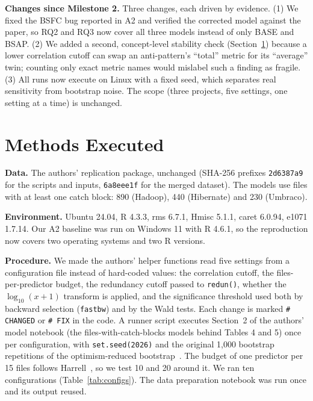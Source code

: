 \documentclass[conference]{IEEEtran}
\begin{document}
\textbf{Changes since Milestone 2.} Three changes, each driven by evidence. (1) We fixed the BSFC bug reported in A2 and verified the corrected model against the paper, so RQ2 and RQ3 now cover all three models instead of only BASE and BSAP. (2) We added a second, concept-level stability check (Section~\ref{sec:methods}) because a lower correlation cutoff can swap an anti-pattern's ``total'' metric for its ``average'' twin; counting only exact metric names would mislabel such a finding as fragile. (3) All runs now execute on Linux with a fixed seed, which separates real sensitivity from bootstrap noise. The scope (three projects, five settings, one setting at a time) is unchanged.

\section{Methods Executed}\label{sec:methods}
\textbf{Data.} The authors' replication package, unchanged (SHA-256 prefixes \texttt{2d6387a9} for the scripts and inputs, \texttt{6a8eee1f} for the merged dataset). The models use files with at least one catch block: 890 (Hadoop), 440 (Hibernate) and 230 (Umbraco).

\textbf{Environment.} Ubuntu 24.04, R 4.3.3, rms 6.7.1, Hmisc 5.1.1, caret 6.0.94, e1071 1.7.14. Our A2 baseline was run on Windows 11 with R 4.6.1, so the reproduction now covers two operating systems and two R versions.

\textbf{Procedure.} We made the authors' helper functions read five settings from a configuration file instead of hard-coded values: the correlation cutoff, the files-per-predictor budget, the redundancy cutoff passed to \texttt{redun()}, whether the $\log_{10}(x+1)$ transform is applied, and the significance threshold used both by backward selection (\texttt{fastbw}) and by the Wald tests. Each change is marked \texttt{\# CHANGED} or \texttt{\# FIX} in the code. A runner script executes Section~2 of the authors' model notebook (the files-with-catch-blocks models behind Tables 4 and 5) once per configuration, with \texttt{set.seed(2026)} and the original 1,000 bootstrap repetitions of the optimism-reduced bootstrap~\cite{tantithamthavorn2017tse}. The budget of one predictor per 15 files follows Harrell~\cite{harrell2015rms}, so we test 10 and 20 around it. We ran ten configurations (Table~\ref{tab:configs}). The data preparation notebook was run once and its output reused.
\end{document}
